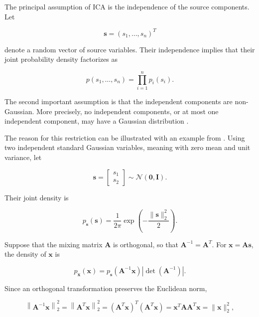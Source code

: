 \documentclass[english]{pwr_wmat_praca_dyplomowa}
\theoremstyle{definition}
\theoremstyle{remark}
\begin{document}
The principal assumption of ICA is the independence of the source components. Let

\begin{equation}
    \mathbf{s} = \left(s_1, \ldots, s_n\right)^T
\end{equation}

denote a random vector of source variables. Their independence implies that their joint probability density factorizes as

\begin{equation}
    p(s_1, \ldots, s_n) = \prod_{i=1}^{n}p_i(s_i).
\end{equation}

The second important assumption is that the independent components are non-Gaussian. More precisely, no independent components, or at most one independent component, may have a Gaussian distribution \cite[p. 163]{ica}.

The reason for this restriction can be illustrated with an example from \cite[Section~7.5]{ica}. Using two independent standard Gaussian variables, meaning with zero mean and unit variance, let

\begin{equation}
    \mathbf{s} = \begin{bmatrix}
        s_1 \\
        s_2
    \end{bmatrix}
    \sim \mathcal{N} \left(\mathbf{0}, \mathbf{I}\right).
\end{equation}

Their joint density is

\begin{equation}
    p_{\mathbf{s}}(\mathbf{s}) = \frac{1}{2\pi} \exp \left(-\frac{\|\mathbf{s}\|_2^2}{2}\right).
\end{equation}

Suppose that the mixing matrix $\mathbf{A}$ is orthogonal, so that $\mathbf{A}^{-1} = \mathbf{A}^T$. For $\mathbf{x} = \mathbf{A}\mathbf{s}$, the density of $\mathbf{x}$ is

\begin{equation}
    p_{\mathbf{x}}(\mathbf{x}) = p_{\mathbf{s}} \left(\mathbf{A}^{-1}\mathbf{x}\right) \left|\det\left(\mathbf{A}^{-1}\right)\right|.
\end{equation}

Since an orthogonal transformation preserves the Euclidean norm,

\begin{equation}
    \left\|\mathbf{A}^{-1}\mathbf{x} \right\|_2^2
    = \left\|\mathbf{A}^T\mathbf{x}\right\|_2^2
    = (\mathbf{A}^T\mathbf{x})^T(\mathbf{A}^T\mathbf{x})
    = \mathbf{x}^T\mathbf{A}\mathbf{A}^T\mathbf{x}
    = \|\mathbf{x}\|_2^2,
\end{equation}
\end{document}
